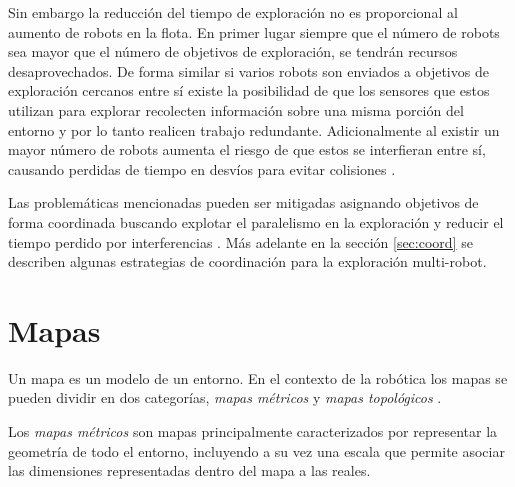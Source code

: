 Sin embargo la reducción del tiempo de exploración no es proporcional al
aumento de robots en la flota. En primer lugar siempre que el número de robots
sea mayor que el número de objetivos de exploración, se tendrán recursos
desaprovechados. De forma similar si varios robots son enviados a objetivos de
exploración cercanos entre sí existe la posibilidad de que los sensores que
estos utilizan para explorar recolecten información sobre una misma porción del
entorno y por lo tanto realicen trabajo redundante. Adicionalmente al existir
un mayor número de robots aumenta el riesgo de que estos se interfieran entre
sí, causando perdidas de tiempo en desvíos para evitar colisiones
\cite{guzzoni1997many,goldberg1997interference}. 

Las problemáticas mencionadas pueden ser mitigadas asignando objetivos de forma
coordinada buscando explotar el paralelismo en la exploración y reducir el
tiempo perdido por interferencias \cite{nieto2014coordination}. Más adelante en
la sección \ref{sec:coord} se describen algunas estrategias de coordinación para 
la exploración multi-robot. 




\section{Mapas}\label{subsec:mapas} %
Un mapa es un modelo de un entorno. En el contexto de la robótica los mapas se pueden dividir en dos categorías, \emph{mapas métricos} y \emph{mapas topológicos} \cite{Thrun1998,choset2005principles}.

Los \emph{mapas métricos} son mapas principalmente caracterizados por representar la geometría de todo el entorno, incluyendo a su vez una escala que permite asociar las dimensiones representadas dentro del mapa a las reales.

